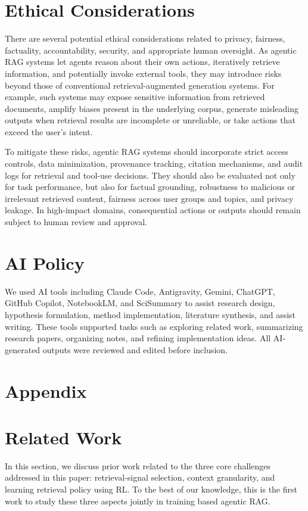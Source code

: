 \documentclass[11pt]{article}
\begin{document}
\section*{Ethical Considerations}
There are several potential ethical considerations related to privacy, fairness, factuality, accountability, security, and appropriate human oversight. As agentic RAG systems let agents reason about their own actions, iteratively retrieve information, and potentially invoke external tools, they may introduce risks beyond those of conventional retrieval-augmented generation systems. For example, such systems may expose sensitive information from retrieved documents, amplify biases present in the underlying corpus, generate misleading outputs when retrieval results are incomplete or unreliable, or take actions that exceed the user’s intent.

To mitigate these risks, agentic RAG systems should incorporate strict access controls, data minimization, provenance tracking, citation mechanisms, and audit logs for retrieval and tool-use decisions. They should also be evaluated not only for task performance, but also for factual grounding, robustness to malicious or irrelevant retrieved content, fairness across user groups and topics, and privacy leakage. In high-impact domains, consequential actions or outputs should remain subject to human review and approval.

\section*{AI Policy}
We used AI tools including  Claude Code, Antigravity, Gemini, ChatGPT, GitHub Copilot, NotebookLM, and SciSummary to assist research design, hypothesis formulation, method implementation, literature synthesis, and assist writing. These tools supported tasks such as exploring related work, summarizing research papers, organizing notes, and refining implementation ideas. All AI-generated outputs were reviewed and edited before inclusion. 




\appendix

\section*{Appendix}
\label{sec:appendix}

\section{Related Work}
\label{sec:related_work}
In this section, we discuss prior work related to the three core challenges addressed in this paper: retrieval-signal selection, context granularity, and learning retrieval policy using RL. To the best of our knowledge, this is the first work to study these three aspects jointly in training based   agentic RAG.
\end{document}
